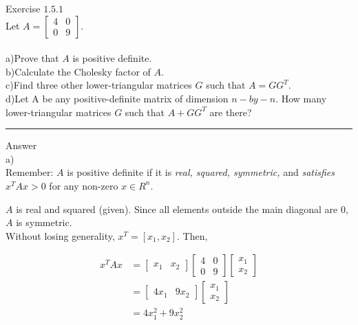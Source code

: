 \documentclass[11pt]{article}
\begin{document}
Exercise $1.5.1$\\


Let 
$
A = 
\begin{bmatrix}
	4	&	0\\
	0	&	9
\end{bmatrix}
$.\\\\


a)Prove that $A$ is positive definite.\\

b)Calculate the Cholesky factor of $A$.\\

c)Find three other lower-triangular matrices $G$ such that $A = GG^T$.\\

d)Let A be any positive-definite matrix of dimension $n-by-n$. How many lower-triangular matrices $G$ such that $A + GG^T$ are there?

\noindent\rule{\textwidth}{1pt}

Answer\\

a)\\
Remember: $A$ is positive definite if it is \textit{real, squared, symmetric,} and \textit{satisfies $x^TAx > 0$} for any non-zero $x \in R^n$.

$A$ is real and squared (given). Since all elements outside the main diagonal are $0$, $A$ is symmetric.\\
Without losing generality, $x^T = [x_1, x_2]$. Then,

\begin{equation}
\begin{split}
x^TAx&= 
\begin{bmatrix}
	x_1	&	x_2
\end{bmatrix}
\begin{bmatrix}
	4	&	0\\
	0	&	9
\end{bmatrix}
\begin{bmatrix}
	x_1\\
	x_2
\end{bmatrix}\\
&=
\begin{bmatrix}
	4x_1	&	9x_2
\end{bmatrix}
\begin{bmatrix}
	x_1\\
	x_2
\end{bmatrix}\\
&=
4x_1^2 + 9x_2^2
\end{split}
\end{equation}
\end{document}
